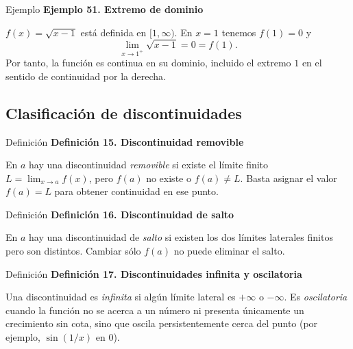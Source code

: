 \documentclass[12pt,aspectratio=169]{beamer}
\begin{document}
\begin{frame}[t,allowframebreaks]{Ejemplo}
{\color{azul}\bfseries Ejemplo 51. Extremo de dominio}\par\medskip

$f(x)=\sqrt{x-1}$ está definida en $[1,\infty)$. En $x=1$ tenemos $f(1)=0$ y
\[
 \lim_{x\to1^+}\sqrt{x-1}=0=f(1).
\]
Por tanto, la función es continua en su dominio, incluido el extremo $1$ en el sentido de continuidad por la derecha.
\end{frame}


\subsection{Clasificación de discontinuidades}

\begin{frame}[t,allowframebreaks]{Definición}
{\color{azul}\bfseries Definición 15. Discontinuidad removible}\par\medskip

En $a$ hay una discontinuidad \emph{removible} si existe el límite finito $L=\lim_{x\to a}f(x)$, pero $f(a)$ no existe o $f(a)\ne L$. Basta asignar el valor $f(a)=L$ para obtener continuidad en ese punto.
\end{frame}


\begin{frame}[t,allowframebreaks]{Definición}
{\color{azul}\bfseries Definición 16. Discontinuidad de salto}\par\medskip

En $a$ hay una discontinuidad de \emph{salto} si existen los dos límites laterales finitos pero son distintos. Cambiar sólo $f(a)$ no puede eliminar el salto.
\end{frame}


\begin{frame}[t,allowframebreaks]{Definición}
{\color{azul}\bfseries Definición 17. Discontinuidades infinita y oscilatoria}\par\medskip

Una discontinuidad es \emph{infinita} si algún límite lateral es $+\infty$ o $-\infty$. Es \emph{oscilatoria} cuando la función no se acerca a un número ni presenta únicamente un crecimiento sin cota, sino que oscila persistentemente cerca del punto (por ejemplo, $\sin(1/x)$ en $0$).
\end{frame}
\end{document}
